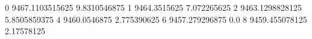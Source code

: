 0 9467.1103515625 9.8310546875
1 9464.3515625 7.072265625
2 9463.1298828125 5.8505859375
4 9460.0546875 2.775390625
6 9457.279296875 0.0
8 9459.455078125 2.17578125
